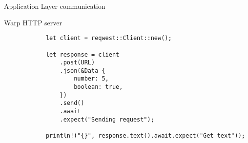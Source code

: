 \begin{frame}[fragile]{Application Layer communication}
    \begin{block}{Warp HTTP server}
        \begin{verbatim}
            let client = reqwest::Client::new();

            let response = client
                .post(URL)
                .json(&Data {
                    number: 5,
                    boolean: true,
                })
                .send()
                .await
                .expect("Sending request");

            println!("{}", response.text().await.expect("Get text"));
        \end{verbatim}
    \end{block}

\end{frame}
